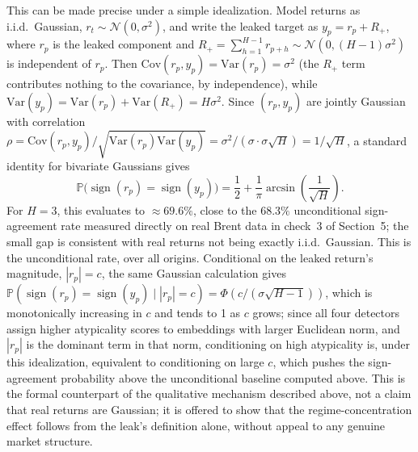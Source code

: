 \documentclass[preprint,12pt]{elsarticle}
\begin{document}
This can be made precise under a simple idealization. Model returns as i.i.d.\ Gaussian,
$r_t \sim \mathcal{N}(0,\sigma^2)$, and write the leaked target as $y_p = r_p + R_{+}$, where
$r_p$ is the leaked component and $R_{+} = \sum_{h=1}^{H-1} r_{p+h} \sim
\mathcal{N}(0,(H-1)\sigma^2)$ is independent of $r_p$. Then $\mathrm{Cov}(r_p,y_p) = \mathrm{Var}(r_p) = \sigma^2$ (the $R_{+}$
term contributes nothing to the covariance, by independence), while $\mathrm{Var}(y_p) =
\mathrm{Var}(r_p) + \mathrm{Var}(R_{+}) = H\sigma^2$. Since $(r_p, y_p)$ are jointly Gaussian
with correlation $\rho = \mathrm{Cov}(r_p,y_p)/\sqrt{\mathrm{Var}(r_p)\mathrm{Var}(y_p)} =
\sigma^2/(\sigma\cdot\sigma\sqrt{H}) = 1/\sqrt{H}$, a standard identity for bivariate Gaussians gives
\begin{equation}
\mathbb{P}\bigl(\operatorname{sign}(r_p) = \operatorname{sign}(y_p)\bigr)
= \frac{1}{2} + \frac{1}{\pi}\arcsin\!\left(\frac{1}{\sqrt{H}}\right).
\end{equation}
For $H=3$, this evaluates to $\approx 69.6\%$, close to the $68.3\%$ unconditional sign-agreement
rate measured directly on real Brent data in check~3 of Section~5; the small gap is consistent
with real returns not being exactly i.i.d.\ Gaussian. This is the unconditional rate, over all
origins. Conditional on the leaked return's magnitude, $|r_p|=c$, the same Gaussian calculation
gives $\mathbb{P}(\operatorname{sign}(r_p)=\operatorname{sign}(y_p) \mid |r_p|=c) =
\Phi(c/(\sigma\sqrt{H-1}))$, which is monotonically increasing in $c$ and tends to 1 as $c$
grows; since all four detectors assign higher atypicality scores to embeddings with larger
Euclidean norm, and $|r_p|$ is the dominant term in that norm, conditioning on high atypicality
is, under this idealization, equivalent to conditioning on large $c$, which pushes the
sign-agreement probability above the unconditional baseline computed above. This is the formal
counterpart of the qualitative mechanism described above, not a claim that real returns are
Gaussian; it is offered to show that the regime-concentration effect follows from the leak's
definition alone, without appeal to any genuine market structure.
\end{document}
